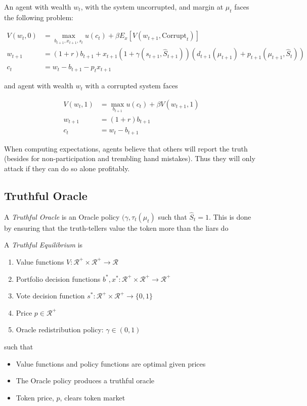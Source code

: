 \documentclass[12pt]{article}
\begin{document}
    An agent with wealth $w_t$, with the system uncorrupted, and margin at $\mu_t$ faces the
    following problem:

    \begin{align}
      V(w_t, 0) &= \max_{b_{t+1}, x_{t+1}, s_{t}} u(c_t) + \beta E_x \left[ V(w_{t+1}, \text{Corrupt}_t) \right] \\
      w_{t+1} &= (1 + r) b_{t+1} + x_{t+1} (1 + \gamma(s_{t+1}, \hat{S}_{t+1})) (d_{t+1}(\mu_{t+1}) + p_{t+1}(\mu_{t+1}, \hat{S}_t)) \\
      c_t &= w_t - b_{t+1} - p_t x_{t+1}
    \end{align}

    and agent with wealth $w_t$ with a corrupted system faces

    \begin{align*}
      V(w_t, 1) &= \max_{b_{t+1}} u(c_t) + \beta V(w_{t+1}, 1) \\
      w_{t+1} &= (1 + r) b_{t+1} \\
      c_t &= w_t - b_{t+1}
    \end{align*}

    When computing expectations, agents believe that others will report the truth (besides for
    non-participation and trembling hand mistakes). Thus they will only attack if they can do so alone
    profitably.

  \subsection{Truthful Oracle}

    A \textit{Truthful Oracle} is an Oracle policy $(\gamma, \tau_t(\mu_t)$ such that
    $\hat{S}_t = 1$. This is done by ensuring that the truth-tellers value the token more than the
    liars do

    A \textit{Truthful Equilibrium} is

    \begin{enumerate}
      \item Value functions $V : \mathcal{R}^+ \times \mathcal{R}^+ \rightarrow \mathcal{R}$
      \item Portfolio decision functions $b^*, x^* : \mathcal{R}^+ \times \mathcal{R}^+ \rightarrow \mathcal{R}^{+}$
      \item Vote decision function $s^*: \mathcal{R}^+ \times \mathcal{R}^+ \rightarrow \{0, 1 \}$
      \item Price $p \in \mathcal{R}^+$
      \item Oracle redistribution policy: $\gamma \in (0, 1)$
    \end{enumerate}

    such that

    \begin{itemize}
      \item Value functions and policy functions are optimal given prices
      \item The Oracle policy produces a truthful oracle
      \item Token price, $p$, clears token market
    \end{itemize}
\end{document}
